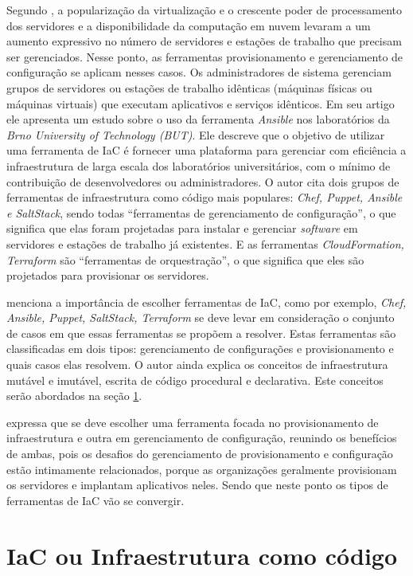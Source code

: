 Segundo , a popularização da virtualização e o crescente poder de processamento dos servidores e a disponibilidade da computação em nuvem levaram a um aumento expressivo no número de servidores e estações de trabalho que precisam ser gerenciados. Nesse ponto, as ferramentas provisionamento e gerenciamento de configuração se aplicam nesses casos. Os administradores de sistema gerenciam grupos de servidores ou estações de trabalho idênticas (máquinas físicas ou máquinas virtuais) que executam aplicativos e serviços idênticos. Em seu artigo ele apresenta um estudo sobre o uso da ferramenta \textit{Ansible} nos laboratórios da \textit{Brno University of Technology (BUT)}. Ele descreve que o objetivo de utilizar uma ferramenta de IaC é fornecer uma plataforma para gerenciar com eficiência a infraestrutura de larga escala dos laboratórios universitários, com o mínimo de contribuição de desenvolvedores ou administradores.
O autor cita dois grupos de ferramentas de infraestrutura como código mais populares: \textit{Chef, Puppet, Ansible e SaltStack}, sendo todas “ferramentas de gerenciamento de configuração”, o que significa que elas foram projetadas para instalar e gerenciar \textit{software} em servidores e estações de trabalho já existentes. E as ferramentas \textit{CloudFormation, Terraform} são “ferramentas de orquestração”, o que significa que eles são projetados para provisionar os servidores.

\hfill

  menciona a importância de escolher ferramentas de IaC, como por exemplo, \textit{ Chef, Ansible, Puppet, SaltStack, Terraform } se deve levar em consideração o conjunto de casos em que essas ferramentas se propõem a resolver. Estas ferramentas são classificadas em dois tipos: gerenciamento de configurações e provisionamento e quais casos elas resolvem. O autor ainda explica os conceitos de infraestrutura mutável e imutável, escrita de código procedural e declarativa. Este conceitos serão abordados na seção \ref{IaC}. 

 expressa que se deve escolher uma ferramenta focada no provisionamento de infraestrutura e outra em gerenciamento de configuração, reunindo os benefícios de ambas, pois os desafios do gerenciamento de provisionamento e configuração estão intimamente relacionados, porque as organizações geralmente provisionam os servidores e implantam aplicativos neles. Sendo que neste ponto os tipos de ferramentas de IaC vão se convergir.   

\section{\esp IaC ou Infraestrutura como código} \label{IaC}

